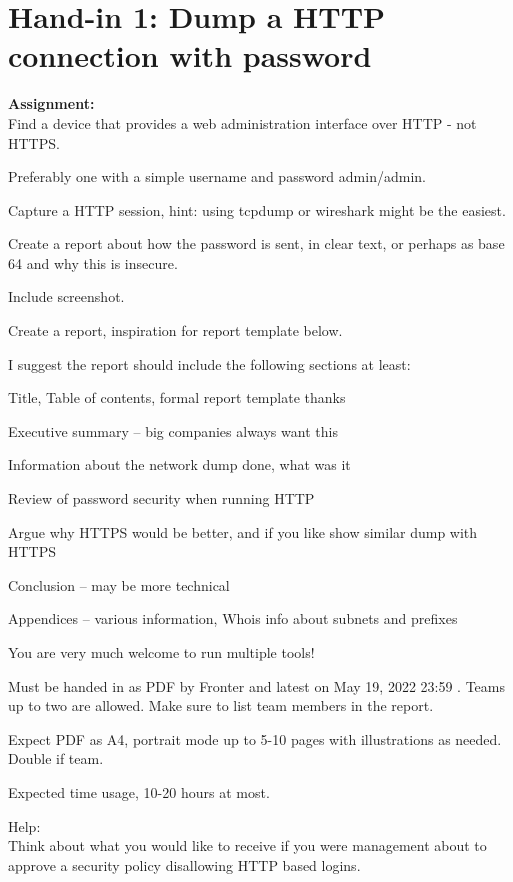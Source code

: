 \documentclass[a4paper,11pt,notitlepage]{report}
\begin{document}
\rm
{}

\newcommand{\course}[1]{KEA Kompetence Penetration Testing\\ exercises}




\setcounter{tocdepth}{0}

\normal

\chapter*{Hand-in 1: Dump a HTTP connection with password}

{\bf Assignment:}\\
Find a device that provides a web administration interface over HTTP - not HTTPS.

Preferably one with a simple username and password admin/admin.

Capture a HTTP session, hint: using tcpdump or wireshark might be the easiest.

Create a report about how the password is sent, in clear text, or perhaps as base 64 and why this is insecure.

Include screenshot.

Create a report, inspiration for report template below.

I suggest the report should include the following sections at least:
\begin{list2}
\item Title, Table of contents, formal report template thanks
\item Executive summary -- big companies always want this
\item Information about the network dump done, what was it
\item Review of password security when running HTTP
\item Argue why HTTPS would be better, and if you like show similar dump with HTTPS
\item Conclusion -- may be more technical
\item Appendices -- various information, Whois info about subnets and prefixes
\end{list2}

You are very much welcome to run multiple tools!

Must be handed in as PDF by Fronter and latest on May 19, 2022 23:59 . Teams up to two are allowed. Make sure to list team members in the report.

Expect PDF as A4, portrait mode up to 5-10 pages with illustrations as needed. Double if team.

Expected time usage, 10-20 hours at most.

Help:\\
Think about what you would like to receive if you were management about to approve a security policy disallowing HTTP based logins.
\end{document}
